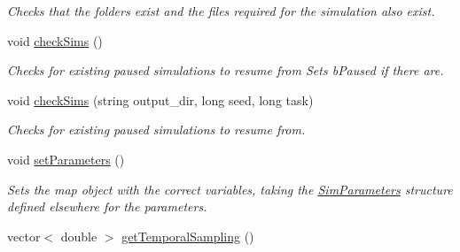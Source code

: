 \begin{DoxyCompactItemize}
\begin{DoxyCompactList}\small\item\em Checks that the folders exist and the files required for the simulation also exist. \end{DoxyCompactList}\item 
void \hyperlink{class_tree_ad0bcc474a9ab1d4e3e2458c4de7304ad}{check\+Sims} ()
\begin{DoxyCompactList}\small\item\em Checks for existing paused simulations to resume from Sets b\+Paused if there are. \end{DoxyCompactList}\item 
void \hyperlink{class_tree_aafaede1da6c79583bf2e28b7a1881a5c}{check\+Sims} (string output\+\_\+dir, long seed, long task)
\begin{DoxyCompactList}\small\item\em Checks for existing paused simulations to resume from. \end{DoxyCompactList}\item 
void \hyperlink{class_tree_ac374d237b7e2e7e11f6a0ff395003635}{set\+Parameters} ()
\begin{DoxyCompactList}\small\item\em Sets the map object with the correct variables, taking the \hyperlink{struct_sim_parameters}{Sim\+Parameters} structure defined elsewhere for the parameters. \end{DoxyCompactList}\item 
vector$<$ double $>$ \hyperlink{class_tree_ac03c034a5730ee4f4d8727aace776412}{get\+Temporal\+Sampling} ()\hypertarget{class_tree_ac03c034a5730ee4f4d8727aace776412}{}\label{class_tree_ac03c034a5730ee4f4d8727aace776412}


\end{DoxyCompactItemize}
